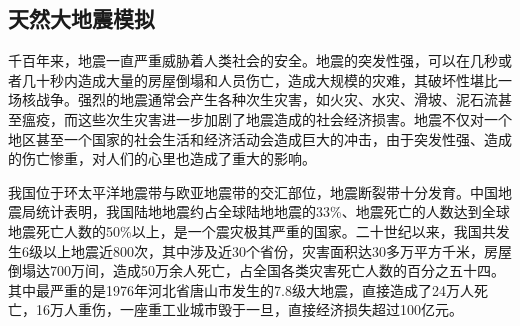 \subsection{天然大地震模拟}

千百年来，地震一直严重威胁着人类社会的安全。地震的突发性强，可以在几秒或者几十秒内造成大量的房屋倒塌和人员伤亡，造成大规模的灾难，其破坏性堪比一场核战争。强烈的地震通常会产生各种次生灾害，如火灾、水灾、滑坡、泥石流甚至瘟疫，而这些次生灾害进一步加剧了地震造成的社会经济损害。地震不仅对一个地区甚至一个国家的社会生活和经济活动会造成巨大的冲击，由于突发性强、造成的伤亡惨重，对人们的心里也造成了重大的影响。

我国位于环太平洋地震带与欧亚地震带的交汇部位，地震断裂带十分发育。中国地震局统计表明，我国陆地地震约占全球陆地地震的33\%、地震死亡的人数达到全球地震死亡人数的50\%以上，是一个震灾极其严重的国家\cite{地震局}。二十世纪以来，我国共发生6级以上地震近800次，其中涉及近30个省份，灾害面积达30多万平方千米，房屋倒塌达700万间，造成50万余人死亡，占全国各类灾害死亡人数的百分之五十四。其中最严重的是1976年河北省唐山市发生的7.8级大地震，直接造成了24万人死亡，16万人重伤，一座重工业城市毁于一旦，直接经济损失超过100亿元\cite{地震局}。

